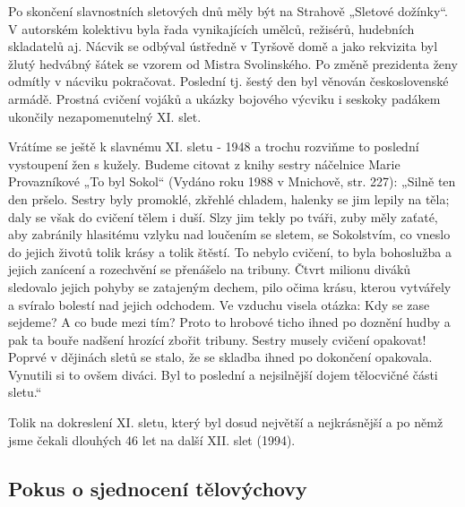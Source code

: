Po skončení slavnostních sletových dnů měly být na Strahově „Sletové
dožínky``. V autorském kolektivu byla řada vynikajících umělců,
režisérů, hudebních skladatelů aj. Nácvik se odbýval ústředně v Tyršově
domě a jako rekvizita byl žlutý hedvábný šátek se vzorem od Mistra
Svolinského. Po změně prezidenta ženy odmítly v nácviku pokračovat.
Poslední tj. šestý den byl věnován československé armádě. Prostná
cvičení vojáků a ukázky bojového výcviku i seskoky padákem ukončily
nezapomenutelný XI. slet.

Vrátíme se ještě k slavnému XI. sletu - 1948 a trochu rozviňme to
poslední vystoupení žen s kužely. Budeme citovat z knihy sestry
náčelnice Marie Provazníkové „To byl Sokol`` (Vydáno roku 1988 v
Mnichově, str. 227): „Silně ten den pršelo. Sestry byly promoklé,
zkřehlé chladem, halenky se jim lepily na těla; daly se však do cvičení
tělem i duší. Slzy jim tekly po tváři, zuby měly zaťaté, aby zabránily
hlasitému vzlyku nad loučením se sletem, se Sokolstvím, co vneslo do
jejich životů tolik krásy a tolik štěstí. To nebylo cvičení, to byla
bohoslužba a jejich zanícení a rozechvění se přenášelo na tribuny. Čtvrt
milionu diváků sledovalo jejich pohyby se zatajeným dechem, pilo očima
krásu, kterou vytvářely a svíralo bolestí nad jejich odchodem. Ve
vzduchu visela otázka: Kdy se zase sejdeme? A co bude mezi tím? Proto to
hrobové ticho ihned po doznění hudby a pak ta bouře nadšení hrozící
zbořit tribuny. Sestry musely cvičení opakovat! Poprvé v dějinách sletů
se stalo, že se skladba ihned po dokončení opakovala. Vynutili si to
ovšem diváci. Byl to poslední a nejsilnější dojem tělocvičné části
sletu.``

Tolik na dokreslení XI. sletu, který byl dosud největší a nejkrásnější a
po němž jsme čekali dlouhých 46 let na další XII. slet (1994).

\subsection{Pokus o sjednocení
tělovýchovy}\label{pokus-o-sjednocenuxed-tux11blovuxfdchovy}

